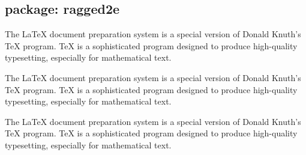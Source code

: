 \subsection{package: ragged2e}

%
\begin{filecontents*}{\democodefile}
\begin{FlushLeft}
The \LaTeX{} document preparation 
system is a special version of Donald
Knuth's \TeX{} program. \TeX{} is a 
sophisticated program designed to 
produce high-quality typesetting, 
especially for mathematical text.
\end{FlushLeft}
\end{filecontents*}

\begin{filecontents*}{\democodefile}
\begin{FlushRight}
The \LaTeX{} document preparation 
system is a special version of Donald
Knuth's \TeX{} program. \TeX{} is a 
sophisticated program designed to 
produce high-quality typesetting, 
especially for mathematical text.
\end{FlushRight}
\end{filecontents*}

\begin{filecontents*}{\democodefile}
\begin{Centering}
The \LaTeX{} document preparation 
system is a special version of Donald
Knuth's \TeX{} program. \TeX{} is a 
sophisticated program designed to 
produce high-quality typesetting, 
especially for mathematical text.
\end{Centering}
\end{filecontents*}

